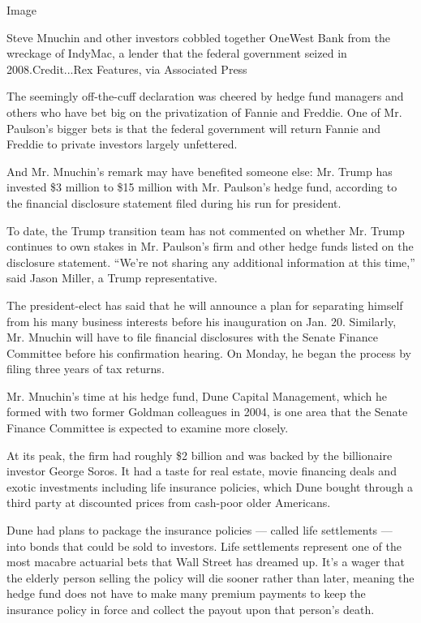Image

Steve Mnuchin and other investors cobbled together OneWest Bank from the
wreckage of IndyMac, a lender that the federal government seized in
2008.Credit...Rex Features, via Associated Press

The seemingly off-the-cuff declaration was cheered by hedge fund
managers and others who have bet big on the privatization of Fannie and
Freddie. One of Mr. Paulson's bigger bets is that the federal government
will return Fannie and Freddie to private investors largely unfettered.

And Mr. Mnuchin's remark may have benefited someone else: Mr. Trump has
invested \$3 million to \$15 million with Mr. Paulson's hedge fund,
according to the financial disclosure statement filed during his run for
president.

To date, the Trump transition team has not commented on whether Mr.
Trump continues to own stakes in Mr. Paulson's firm and other hedge
funds listed on the disclosure statement. ``We're not sharing any
additional information at this time,'' said Jason Miller, a Trump
representative.

The president-elect has said that he will announce a plan for separating
himself from his many business interests before his inauguration on Jan.
20. Similarly, Mr. Mnuchin will have to file financial disclosures with
the Senate Finance Committee before his confirmation hearing. On Monday,
he began the process by filing three years of tax returns.

Mr. Mnuchin's time at his hedge fund, Dune Capital Management, which he
formed with two former Goldman colleagues in 2004, is one area that the
Senate Finance Committee is expected to examine more closely.

At its peak, the firm had roughly \$2 billion and was backed by the
billionaire investor George Soros. It had a taste for real estate, movie
financing deals and exotic investments including life insurance
policies, which Dune bought through a third party at discounted prices
from cash-poor older Americans.

Dune had plans to package the insurance policies --- called life
settlements --- into bonds that could be sold to investors. Life
settlements represent one of the most macabre actuarial bets that Wall
Street has dreamed up. It's a wager that the elderly person selling the
policy will die sooner rather than later, meaning the hedge fund does
not have to make many premium payments to keep the insurance policy in
force and collect the payout upon that person's death.

